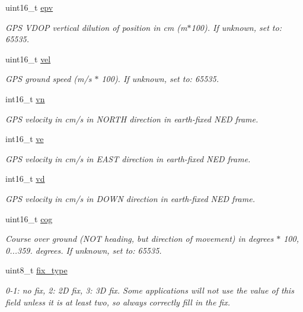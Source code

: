 \begin{DoxyCompactItemize}
uint16\+\_\+t \hyperlink{struct____mavlink__hil__gps__t_aaf9040cabae429efd2901d51ee3a4969}{epv}
\begin{DoxyCompactList}\small\item\em G\+P\+S V\+D\+O\+P vertical dilution of position in cm (m$\ast$100). If unknown, set to\+: 65535. \end{DoxyCompactList}\item 
uint16\+\_\+t \hyperlink{struct____mavlink__hil__gps__t_ac586576e58891b09ca979d421465ac81}{vel}
\begin{DoxyCompactList}\small\item\em G\+P\+S ground speed (m/s $\ast$ 100). If unknown, set to\+: 65535. \end{DoxyCompactList}\item 
int16\+\_\+t \hyperlink{struct____mavlink__hil__gps__t_aff2b255f76bb2f80ccc690d70c11195b}{vn}
\begin{DoxyCompactList}\small\item\em G\+P\+S velocity in cm/s in N\+O\+R\+T\+H direction in earth-\/fixed N\+E\+D frame. \end{DoxyCompactList}\item 
int16\+\_\+t \hyperlink{struct____mavlink__hil__gps__t_a7c3f8d60cff9df9d2d03b3ac84bbfb15}{ve}
\begin{DoxyCompactList}\small\item\em G\+P\+S velocity in cm/s in E\+A\+S\+T direction in earth-\/fixed N\+E\+D frame. \end{DoxyCompactList}\item 
int16\+\_\+t \hyperlink{struct____mavlink__hil__gps__t_a3d764d688357582b0aba5da4992579b5}{vd}
\begin{DoxyCompactList}\small\item\em G\+P\+S velocity in cm/s in D\+O\+W\+N direction in earth-\/fixed N\+E\+D frame. \end{DoxyCompactList}\item 
uint16\+\_\+t \hyperlink{struct____mavlink__hil__gps__t_a7a0d3eba01b2e7cb3fb52d10192a7881}{cog}
\begin{DoxyCompactList}\small\item\em Course over ground (N\+O\+T heading, but direction of movement) in degrees $\ast$ 100, 0...359. degrees. If unknown, set to\+: 65535. \end{DoxyCompactList}\item 
uint8\+\_\+t \hyperlink{struct____mavlink__hil__gps__t_ab823793fa4f3c3f56b1879faedc8776e}{fix\+\_\+type}
\begin{DoxyCompactList}\small\item\em 0-\/1\+: no fix, 2\+: 2\+D fix, 3\+: 3\+D fix. Some applications will not use the value of this field unless it is at least two, so always correctly fill in the fix. \end{DoxyCompactList}\item 

\end{DoxyCompactItemize}

